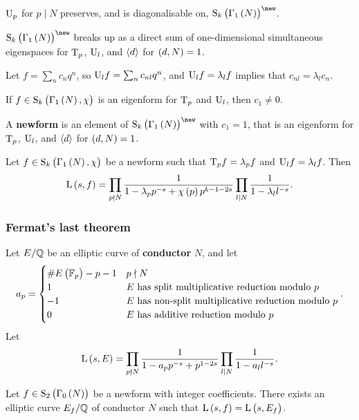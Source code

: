 \begin{corollary}
$ \mathrm{U}_p $ for $ p \mid N $ preserves, and is diagonalisable on, $ \S_k\br{\Gamma_1\br{N}}^{\new} $.
\end{corollary}

\begin{corollary}
$ \S_k\br{\Gamma_1\br{N}}^{\new} $ breaks up as a direct sum of one-dimensional simultaneous eigenspaces for $ \mathrm{T}_p $, $ \mathrm{U}_l $, and $ \left\langle d \right\rangle $ for $ \br{d, N} = 1 $.
\end{corollary}

Let $ f = \sum_n c_nq^n $, so $ \mathrm{U}_lf = \sum_n c_{nl}q^n $, and $ \mathrm{U}_lf = \lambda_lf $ implies that $ c_{nl} = \lambda_lc_n $.

\begin{corollary}
If $ f \in \S_k\br{\Gamma_1\br{N}, \chi} $ is an eigenform for $ \mathrm{T}_p $ and $ \mathrm{U}_l $, then $ c_1 \ne 0 $.
\end{corollary}

\begin{definition}
A \textbf{newform} is an element of $ \S_k\br{\Gamma_1\br{N}}^{\new} $ with $ c_1 = 1 $, that is an eigenform for $ \mathrm{T}_p $, $ \mathrm{U}_l $, and $ \left\langle d \right\rangle $ for $ \br{d, N} = 1 $.
\end{definition}

Let $ f \in \S_k\br{\Gamma_1\br{N}, \chi} $ be a newform such that $ \mathrm{T}_pf = \lambda_pf $ and $ \mathrm{U}_lf = \lambda_lf $. Then
$$ \L\br{s, f} = \prod_{p \nmid N} \dfrac{1}{1 - \lambda_pp^{-s} + \chi\br{p}p^{k - 1 - 2s}}\prod_{l \mid N} \dfrac{1}{1 - \lambda_ll^{-s}}. $$

\subsubsection{Fermat's last theorem}

Let $ E / \mathbb{Q} $ be an elliptic curve of \textbf{conductor} $ N $, and let
$$ a_p =
\begin{cases}
\#E\br{\FF_p} - p - 1 & p \nmid N \\
1 & E \ \text{has split multiplicative reduction modulo} \ p \\
-1 & E \ \text{has non-split multiplicative reduction modulo} \ p \\
0 & E \ \text{has additive reduction modulo} \ p
\end{cases}.
$$
Let
$$ \L\br{s, E} = \prod_{p \nmid N} \dfrac{1}{1 - a_pp^{-s} + p^{1 - 2s}}\prod_{l \mid N} \dfrac{1}{1 - a_ll^{-s}}. $$

\begin{theorem}
Let $ f \in \S_2\br{\Gamma_0\br{N}} $ be a newform with integer coefficients. There exists an elliptic curve $ E_f / \mathbb{Q} $ of conductor $ N $ such that $ \L\br{s, f} = \L\br{s, E_f} $.
\end{theorem}

